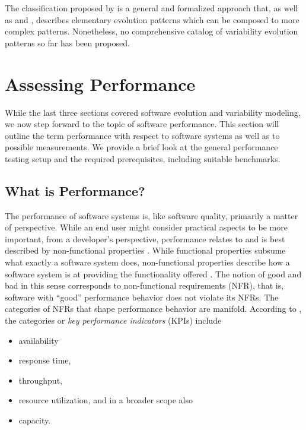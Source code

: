 The classification proposed by \cite{peng_analyzing_2011} is a general and formalized approach
that, as well as \cite{seidl_co-evolution_2012} and \cite{passos_towards_2012}, describes
elementary evolution patterns which can be composed to more complex patterns. Nonetheless, no
comprehensive catalog of variability evolution patterns so far has been
proposed.

\section{Assessing Performance} \label{sec:assessing_performance}
While the last three sections covered software evolution and variability
modeling, we now step forward to the topic of software performance. This
section will outline the term performance with respect to software systems as
well as to possible measurements. We provide a brief look at the general performance
testing setup and the required prerequisites, including suitable benchmarks.

\subsection{What is Performance?}
The performance of software systems is, like software quality, primarily a
matter of perspective. While an end user might consider practical aspects to be
more important, from a developer’s perspective, performance relates to and is
best described by non-functional properties
\citep{liggesmeyer_software-qualitat:_2009,molyneaux_art_2014}.
While functional properties subsume what exactly a software system does, non-functional
properties describe how a software system is at providing the
functionality offered \citep{liggesmeyer_software-qualitat:_2009}. The notion
of good and bad in this sense corresponds to non-functional requirements (NFR),
that is, software with ``good'' performance behavior does not violate its NFRs.
The categories of NFRs that shape performance behavior are manifold. According to \cite{molyneaux_art_2014}, the categories or
\emph{key performance indicators} (KPIs) include 

\begin{itemize}
  \item availability
  \item response time,
  \item throughput,
  \item resource utilization, and in a broader scope also 
  \item capacity.
\end{itemize}

